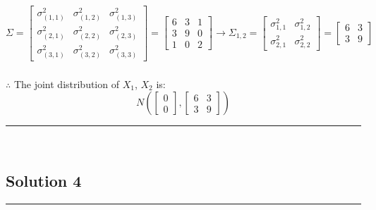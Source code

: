 \documentclass{article}
\begin{document}
$$\Sigma = \begin{bmatrix} \sigma_{(1,1)}^2 & \sigma_{(1,2)}^2 & \sigma_{(1,3)}^2 \\ \sigma_{(2,1)}^2 & \sigma_{(2,2)}^2 & \sigma_{(2,3)}^2 \\ \sigma_{(3,1)}^2 & \sigma_{(3,2)}^2 & \sigma_{(3,3)}^2 \end{bmatrix} = \begin{bmatrix} 6 & 3 & 1 \\ 3 & 9 & 0 \\ 1 & 0 & 2 \end{bmatrix} \rightarrow \Sigma_{1,2} = \begin{bmatrix} \sigma_{1,1}^2 & \sigma_{1,2}^2 \\ \sigma_{2,1}^2 & \sigma_{2,2}^2 \end{bmatrix} = \begin{bmatrix} 6 & 3 \\ 3 & 9 \end{bmatrix}$$ 

\subsubsection*{\normalfont}{$\therefore$ The joint distribution of $X_1$, $X_2$ is:
$$N\left(\begin{bmatrix} 0 \\ 0 \end{bmatrix}, \begin{bmatrix} 6 & 3 \\ 3 & 9 \end{bmatrix}\right)$$}

\noindent\rule{\textwidth}{0.4pt}\\

\newpage

\subsection*{Solution 4}
\noindent\rule{\textwidth}{0.4pt}\\
\end{document}
